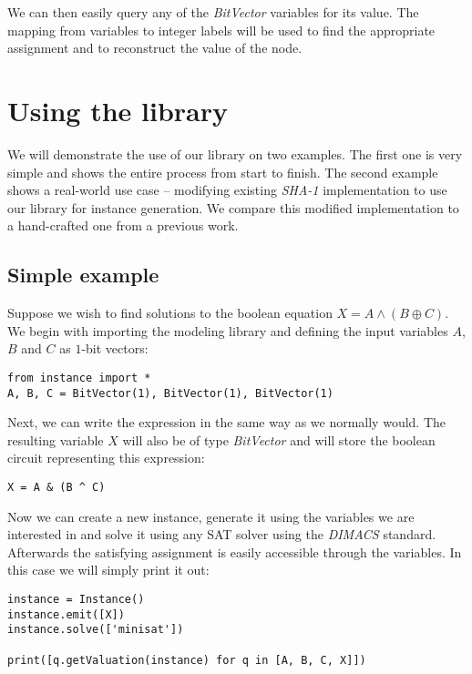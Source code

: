 We can then easily query any of the \emph{BitVector} variables for its value.
The mapping from variables to integer labels will be used to find the appropriate assignment and to reconstruct the value of the node.

\section{Using the library}
We will demonstrate the use of our library on two examples.
The first one is very simple and shows the entire process from start to finish.
The second example shows a real-world use case -- modifying existing \emph{SHA-1} implementation to use our library for instance generation.
We compare this modified implementation to a hand-crafted one from a previous work.

\subsection{Simple example}
Suppose we wish to find solutions to the boolean equation $X = A \land (B \oplus C)$.
We begin with importing the modeling library and defining the input variables $A$,$B$ and $C$ as $1$-bit vectors:
\begin{verbatim}
from instance import *
A, B, C = BitVector(1), BitVector(1), BitVector(1)
\end{verbatim}

Next, we can write the expression in the same way as we normally would.
The resulting variable $X$ will also be of type \emph{BitVector} and will store the boolean circuit representing this expression:
\begin{verbatim}
X = A & (B ^ C)
\end{verbatim}

Now we can create a new instance, generate it using the variables we are interested in and solve it using any SAT solver using the \emph{DIMACS} standard.
Afterwards the satisfying assignment is easily accessible through the variables.
In this case we will simply print it out:

\begin{verbatim}
instance = Instance()
instance.emit([X])
instance.solve(['minisat'])

print([q.getValuation(instance) for q in [A, B, C, X]])
\end{verbatim}

